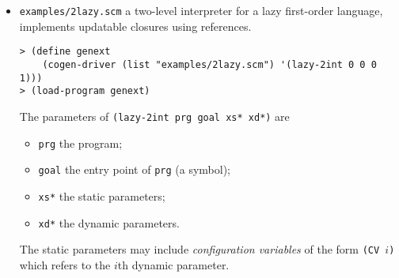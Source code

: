 \documentclass[11pt]{article}
\begin{document}
\begin{itemize}
\item \texttt{examples/2lazy.scm} a two-level interpreter for a lazy
  first-order 
  language, implements updatable closures using references.
\begin{small}
\begin{verbatim}
> (define genext
    (cogen-driver (list "examples/2lazy.scm") '(lazy-2int 0 0 0 1)))
> (load-program genext)
\end{verbatim}
\end{small}
The parameters of \texttt{(lazy-2int prg goal xs* xd*)} are
  \begin{itemize}
  \item \texttt{prg} the program;
  \item \texttt{goal} the entry point of \texttt{prg} (a symbol);
  \item \texttt{xs*} the static parameters;
  \item \texttt{xd*} the dynamic parameters.
  \end{itemize}
  The static parameters may include \emph{configuration variables} of
  the form \texttt{(CV $i$)} which refers to the $i$th dynamic
  parameter.


\end{itemize}
\end{document}
